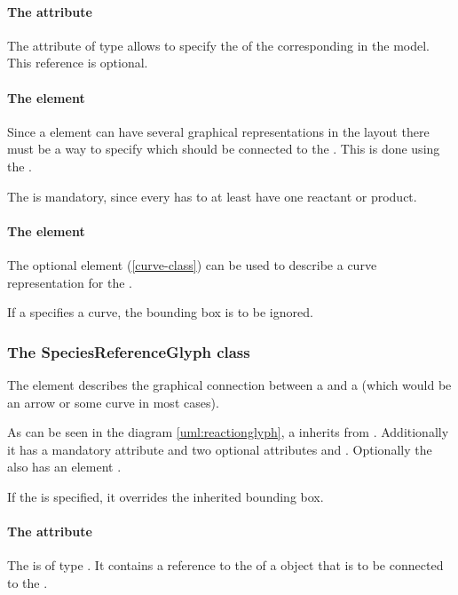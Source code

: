 \paragraph{The  attribute}
The  attribute of type  allows to 
specify the  of the corresponding \Reaction in the model. This 
reference is optional. 


\paragraph {The  element}
\label{listofspeciesreferenceglyphs-class}
Since a \Species element can have several graphical representations in 
the layout there must be a way to specify which \SpeciesGlyph should be 
connected to the \ReactionGlyph. This is done using the 
. 

The \ListOfSpeciesReferenceGlyphs is mandatory, since every \Reaction 
has to at least have one reactant or product. 


\paragraph {The  element}
The optional \Curve element (\ref{curve-class}) can be used to describe 
a curve representation for the \ReactionGlyph. 

If a \ReactionGlyph specifies a curve, the bounding box is to be 
ignored. 


\subsubsection{The SpeciesReferenceGlyph class}
\label{speciesreferenceglyph-class}
The  element describes the graphical 
connection between a \SpeciesGlyph and a \ReactionGlyph (which would be 
an arrow or some curve in most cases). 

As can be seen in the diagram \ref{uml:reactionglyph}, a 
\SpeciesReferenceGlyph inherits from \GraphicalObject. Additionally it 
has a mandatory attribute  and two optional 
attributes  and . Optionally the 
\SpeciesReferenceGlyph also has an element . 

If the  is specified, it overrides the inherited bounding box.


\paragraph{The  attribute}
The  is of type . It contains a 
reference to the  of a \SpeciesGlyph object that is to be 
connected to the \ReactionGlyph. 

